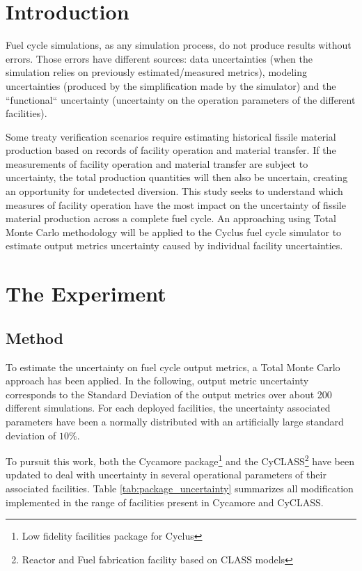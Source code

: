 \documentclass{anstrans}
\title{}
\author{Baptiste Mouginot,$^{*}$ Kathryn Mummah,$^{*}$ Paul P.H. Wilson$^{*}$}
\institute{
$^{*}$University of Wisconsin-Madison, WI
}
\begin{document}
\section{Introduction}

Fuel cycle simulations, as any simulation process, do not produce results
without errors. Those errors have different sources: data uncertainties (when
the simulation relies on previously estimated/measured metrics), modeling
uncertainties (produced by the simplification made by the simulator) and the
``functional`` uncertainty (uncertainty on the operation parameters of the
different facilities).

Some treaty verification scenarios require estimating historical fissile
material production based on records of facility operation and material
transfer.  If the measurements of facility operation and material transfer are
subject to uncertainty, the total production quantities will then also be
uncertain, creating an opportunity for undetected diversion.  This study seeks
to understand which measures of facility operation have the most impact on the
uncertainty of fissile material production across a complete fuel cycle.  An
approaching using Total Monte Carlo methodology will be applied to the Cyclus
fuel cycle simulator \cite{cyclus} to estimate output metrics uncertainty caused
by individual facility uncertainties.

\section{The Experiment}

\subsection{Method}

To estimate the uncertainty on fuel cycle output metrics, a Total Monte
Carlo approach has been applied. In the following, output metric uncertainty
corresponds to the Standard Deviation of the output metrics over about 200
different simulations. For each deployed facilities, the uncertainty associated
parameters have been a normally distributed with an artificially large standard
deviation of $10\%$.

To pursuit this work, both the Cycamore\cite{cycamore} package\footnote{Low
fidelity facilities package for Cyclus} and the
CyCLASS\footnote{Reactor and Fuel fabrication facility based on
    CLASS\cite{CLASS}  models} have been
updated\cite{mouginot_2018, cyclass} to deal with uncertainty in several
operational parameters of their associated facilities.  Table
\ref{tab:package_uncertainty} summarizes all modification implemented in the
range of facilities present in Cycamore and CyCLASS.
\end{document}
